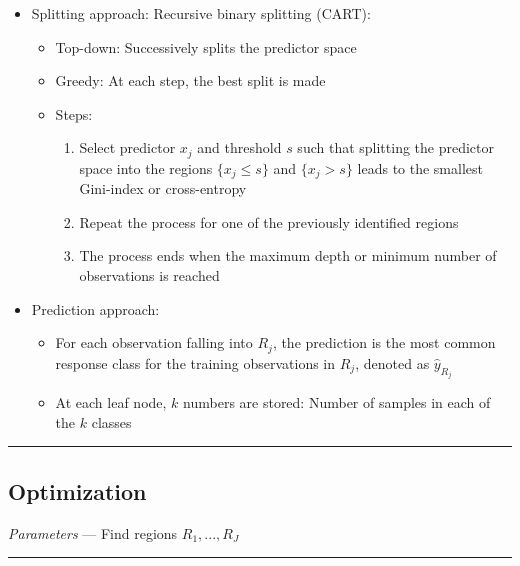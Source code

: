 \begin{itemize}
    \item Splitting approach: Recursive binary splitting (CART):
    \begin{itemize}
        \item Top-down: Successively splits the predictor space
        \item Greedy: At each step, the best split is made
        \item Steps:
        \begin{enumerate}
            \item Select predictor $x_j$ and threshold $s$ such that splitting the predictor space into the regions $\{x_j \leq s\}$ and $\{x_j > s\}$ leads to the smallest Gini-index or cross-entropy
            \item Repeat the process for one of the previously identified regions
            \item The process ends when the maximum depth or minimum number of observations is reached
        \end{enumerate}
    \end{itemize}
    \item Prediction approach:
    \begin{itemize}
        \item For each observation falling into $R_j$, the prediction is the most common response class for the training observations in $R_j$, denoted as $\hat{y}_{R_j}$
        \item At each leaf node, $k$ numbers are stored: Number of samples in each of the $k$ classes
    \end{itemize}
\end{itemize}

{\color{black}\hrule height 0.001mm}

\subsection*{Optimization}
\emph{Parameters} --- Find regions $R_1, ..., R_J$

{\color{lightgray}\hrule height 0.001mm}

